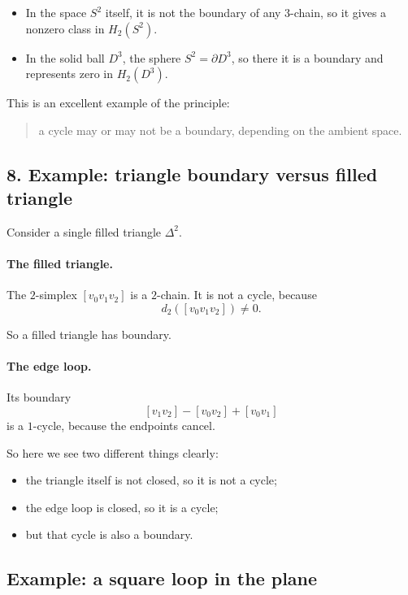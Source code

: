 \documentclass[12pt,a4paper]{article}
\theoremstyle{notespace}
\begin{document}
\begin{itemize}
	\item In the space \(S^2\) itself, it is not the boundary of any \(3\)-chain, so it gives a nonzero class in \(H_2(S^2)\).
	\item In the solid ball \(D^3\), the sphere \(S^2=\partial D^3\), so there it is a boundary and represents zero in \(H_2(D^3)\).
\end{itemize}

This is an excellent example of the principle:

\begin{quote}
	a cycle may or may not be a boundary, depending on the ambient space.
\end{quote}

\subsection{8. Example: triangle boundary versus filled triangle}

Consider a single filled triangle \(\Delta^2\).

\paragraph{The filled triangle.}
The \(2\)-simplex \([v_0v_1v_2]\) is a \(2\)-chain. It is not a cycle, because
\[
d_2([v_0v_1v_2])\neq 0.
\]

So a filled triangle has boundary.

\paragraph{The edge loop.}
Its boundary
\[
[v_1v_2]-[v_0v_2]+[v_0v_1]
\]
is a \(1\)-cycle, because the endpoints cancel.

So here we see two different things clearly:

\begin{itemize}
	\item the triangle itself is not closed, so it is not a cycle;
	\item the edge loop is closed, so it is a cycle;
	\item but that cycle is also a boundary.
\end{itemize}

\subsection{ Example: a square loop in the plane}
\end{document}
